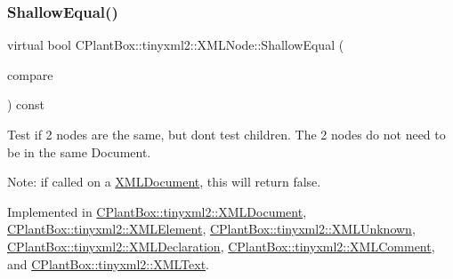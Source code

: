 \mbox{\label{classCPlantBox_1_1tinyxml2_1_1XMLNode_a1019a06dab15152f06f3a879bf9a85c9}} 
\subsubsection{\texorpdfstring{Shallow\+Equal()}{ShallowEqual()}}
{\footnotesize\ttfamily virtual bool C\+Plant\+Box\+::tinyxml2\+::\+X\+M\+L\+Node\+::\+Shallow\+Equal (\begin{DoxyParamCaption}\item[{const \hyperlink{classCPlantBox_1_1tinyxml2_1_1XMLNode}{X\+M\+L\+Node} $\ast$}]{compare }\end{DoxyParamCaption}) const\hspace{0.3cm}{\ttfamily [pure virtual]}}

Test if 2 nodes are the same, but don\textquotesingle{}t test children. The 2 nodes do not need to be in the same Document.

Note\+: if called on a \hyperlink{classCPlantBox_1_1tinyxml2_1_1XMLDocument}{X\+M\+L\+Document}, this will return false. 

Implemented in \hyperlink{classCPlantBox_1_1tinyxml2_1_1XMLDocument_a652692e95a36891e41b2a18eef3eda1b}{C\+Plant\+Box\+::tinyxml2\+::\+X\+M\+L\+Document}, \hyperlink{classCPlantBox_1_1tinyxml2_1_1XMLElement_a12871a9760eb6ddbd564b512b3c11f0e}{C\+Plant\+Box\+::tinyxml2\+::\+X\+M\+L\+Element}, \hyperlink{classCPlantBox_1_1tinyxml2_1_1XMLUnknown_a22777b08f33f0e23c9e2f768a3fbd92f}{C\+Plant\+Box\+::tinyxml2\+::\+X\+M\+L\+Unknown}, \hyperlink{classCPlantBox_1_1tinyxml2_1_1XMLDeclaration_a8f02eb489b226d2b508c151334ad7044}{C\+Plant\+Box\+::tinyxml2\+::\+X\+M\+L\+Declaration}, \hyperlink{classCPlantBox_1_1tinyxml2_1_1XMLComment_a8c25248f7f3f3616dba5652b4c239747}{C\+Plant\+Box\+::tinyxml2\+::\+X\+M\+L\+Comment}, and \hyperlink{classCPlantBox_1_1tinyxml2_1_1XMLText_afd134659ffccdf5a10d88e63cf0009fd}{C\+Plant\+Box\+::tinyxml2\+::\+X\+M\+L\+Text}.

\mbox{\label{classCPlantBox_1_1tinyxml2_1_1XMLNode_ac218177e0866a8c6c6063d9a96238fee}} 
